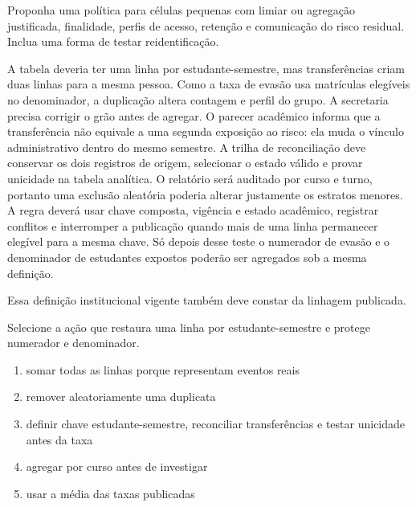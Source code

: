 \FonteDidatica

\Comando Proponha uma política para células pequenas com limiar ou agregação justificada, finalidade, perfis de acesso, retenção e comunicação do risco residual. Inclua uma forma de testar reidentificação.


\TextoBase

A tabela deveria ter uma linha por estudante-semestre, mas transferências criam duas linhas para a mesma pessoa. Como a taxa de evasão usa matrículas elegíveis no denominador, a duplicação altera contagem e perfil do grupo. A secretaria precisa corrigir o grão antes de agregar. O parecer acadêmico informa que a transferência não equivale a uma segunda exposição ao risco: ela muda o vínculo administrativo dentro do mesmo semestre. A trilha de reconciliação deve conservar os dois registros de origem, selecionar o estado válido e provar unicidade na tabela analítica. O relatório será auditado por curso e turno, portanto uma exclusão aleatória poderia alterar justamente os estratos menores. A regra deverá usar chave composta, vigência e estado acadêmico, registrar conflitos e interromper a publicação quando mais de uma linha permanecer elegível para a mesma chave. Só depois desse teste o numerador de evasão e o denominador de estudantes expostos poderão ser agregados sob a mesma definição.

Essa definição institucional vigente também deve constar da linhagem publicada.

\FonteDidatica

\Comando Selecione a ação que restaura uma linha por estudante-semestre e protege numerador e denominador.

\begin{enumerate}[label=\Alph*)]

\item somar todas as linhas porque representam eventos reais

\item remover aleatoriamente uma duplicata

\item definir chave estudante-semestre, reconciliar transferências e testar unicidade antes da taxa

\item agregar por curso antes de investigar

\item usar a média das taxas publicadas

\end{enumerate}

